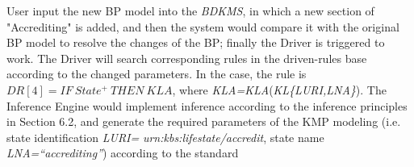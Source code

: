 \documentclass{elsarticle}
\begin{document}
\textrm{User input the new BP model into the
}\textrm{\textit{BDKMS}}\textrm{, in which a new section of
"Accrediting" is added, and then the system
would compare it with the original BP model to resolve the changes of
the BP; finally the Driver is triggered to work. The Driver will search
corresponding rules in the driven-rules base according to the changed
parameters. In the case, the rule is }$DR[4]=IF \ State^+
\ THEN \ KLA$\textrm{, where
}\textrm{\textit{KLA=KLA}}\textrm{(}\textrm{\textit{KL\{LURI,LNA\}}}\textrm{).
The Inference Engine would implement inference according to the
inference principles in Section 6.2, and generate the required
parameters of the KMP modeling (i.e. state identification
}\textrm{\textit{LURI=}}\textrm{\textbf{\textit{
}}}\textrm{\textit{urn:kbs:lifestate/accredit}}\textrm{, state name
}\textrm{\textit{LNA=“accrediting”}}) according to the standard
\end{document}
